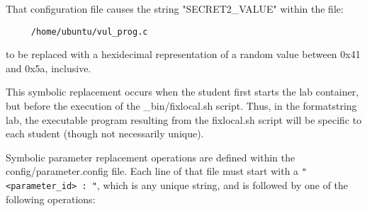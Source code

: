 \documentclass{article}
\begin{document}
That configuration file causes the string "SECRET2\_VALUE" within the file:
\begin{verbatim}
     /home/ubuntu/vul_prog.c
\end{verbatim}
to be replaced with a hexidecimal representation of a random value
between 0x41 and 0x5a, inclusive.

This symbolic replacement occurs when the student first starts the lab container,
but before the execution of the \_bin/fixlocal.sh script.  Thus, in the formatstring
lab, the executable program resulting from the fixlocal.sh script will be specific
to each student (though not necessarily unique).

Symbolic parameter replacement operations are defined within the config/parameter.config file.
Each line of that file must start with a \verb!"<parameter_id> : "!, which is any unique string, and
is followed by one of the following operations:
\end{document}
